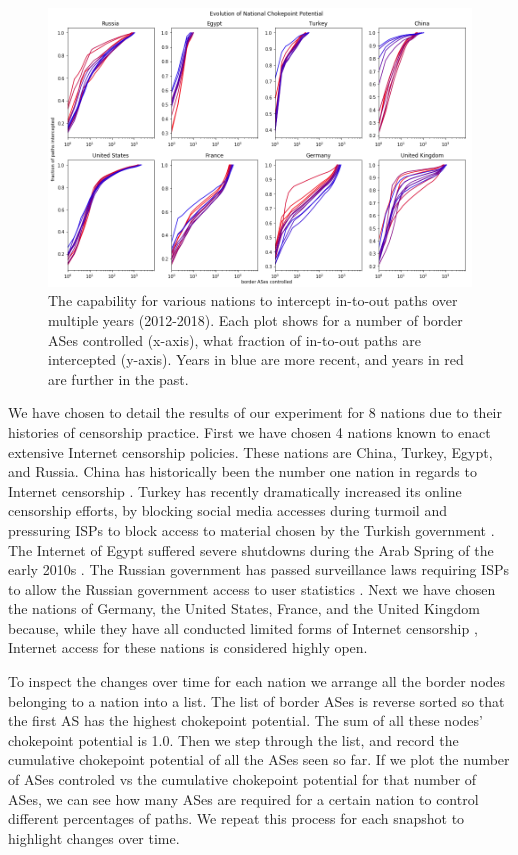 \documentclass[10pt, conference, letterpaper]{IEEEtran}
\newcommand{\timerange}{(2012-2018)}
\begin{document}
\begin{figure}
	\centering
	\includegraphics[width=\textwidth]{multi}
	\caption{The capability for various nations to intercept in-to-out paths over multiple years \timerange. Each plot shows for a number of border ASes controlled (x-axis),
	what fraction of in-to-out paths are intercepted (y-axis). Years in blue are more recent, and years in red are further in the past.}\label{fig:multiTime}
\end{figure}

We have chosen to detail the results of our experiment for 8 nations due to their histories of censorship practice. First we have chosen 4 nations known to enact
extensive Internet censorship policies. These nations are China, Turkey, Egypt, and Russia. China has historically been the number one nation in regards to Internet
censorship \cite{censorshipSurvey}. Turkey has recently dramatically increased its online censorship efforts, by blocking social media accesses during turmoil and pressuring ISPs
to block access to material chosen by the Turkish government \cite{turkeyCensor}. The Internet of Egypt suffered severe shutdowns during the Arab Spring of the early 2010s \cite{arabspring}.
The Russian government has passed surveillance laws requiring ISPs to allow the Russian government access to user statistics \cite{censorshipGeography}. Next we have chosen the nations
of Germany, the United States, France, and the United Kingdom because, while they have all conducted limited forms of Internet censorship \cite{censorshipSurvey}, Internet access for these 
nations is considered highly open.

\par
To inspect the changes over time for each nation we arrange all the border nodes belonging to a nation into a list. The list of border ASes is reverse sorted
so that the first AS has the highest chokepoint potential. The sum of all these nodes' chokepoint potential is 1.0. Then we step through the list, and record
the cumulative chokepoint potential of all the ASes seen so far. If we plot the number of ASes controled vs the cumulative chokepoint potential for that number
of ASes, we can see how many ASes are required for a certain nation to control different percentages of paths. We repeat this process for each snapshot to highlight
changes over time.
\end{document}
